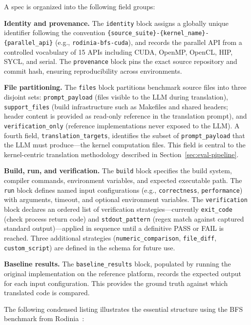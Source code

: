 \documentclass[conference]{IEEEtran}
\begin{document}
A spec is organized into the following field groups:

\textbf{Identity and provenance.} The \texttt{identity} block assigns a globally unique identifier following the convention \texttt{\{source\_suite\}-\{kernel\_name\}-\{parallel\_api\}} (e.g., \texttt{rodinia-bfs-cuda}), and records the parallel API from a controlled vocabulary of 15 APIs including CUDA, OpenMP, OpenCL, HIP, SYCL, and serial. The \texttt{provenance} block pins the exact source repository and commit hash, ensuring reproducibility across environments.

\textbf{File partitioning.} The \texttt{files} block partitions benchmark source files into three disjoint sets: \texttt{prompt\_payload} (files visible to the LLM during translation), \texttt{support\_files} (build infrastructure such as Makefiles and shared headers; header content is provided as read-only reference in the translation prompt), and \texttt{verification\_only} (reference implementations never exposed to the LLM). A fourth field, \texttt{translation\_targets}, identifies the subset of \texttt{prompt\_payload} that the LLM must produce---the kernel computation files. This field is central to the kernel-centric translation methodology described in Section~\ref{sec:eval-pipeline}.

\textbf{Build, run, and verification.} The \texttt{build} block specifies the build system, compiler commands, environment variables, and expected executable path. The \texttt{run} block defines named input configurations (e.g., \texttt{correctness}, \texttt{performance}) with arguments, timeout, and optional environment variables. The \texttt{verification} block declares an ordered list of verification strategies---currently \texttt{exit\_code} (check process return code) and \texttt{stdout\_pattern} (regex match against captured standard output)---applied in sequence until a definitive PASS or FAIL is reached. Three additional strategies (\texttt{numeric\_comparison}, \texttt{file\_diff}, \texttt{custom\_script}) are defined in the schema for future use.

\textbf{Baseline results.} The \texttt{baseline\_results} block, populated by running the original implementation on the reference platform, records the expected output for each input configuration. This provides the ground truth against which translated code is compared.

The following condensed listing illustrates the essential structure using the BFS benchmark from Rodinia~\cite{Rodinia2009}:
\end{document}
